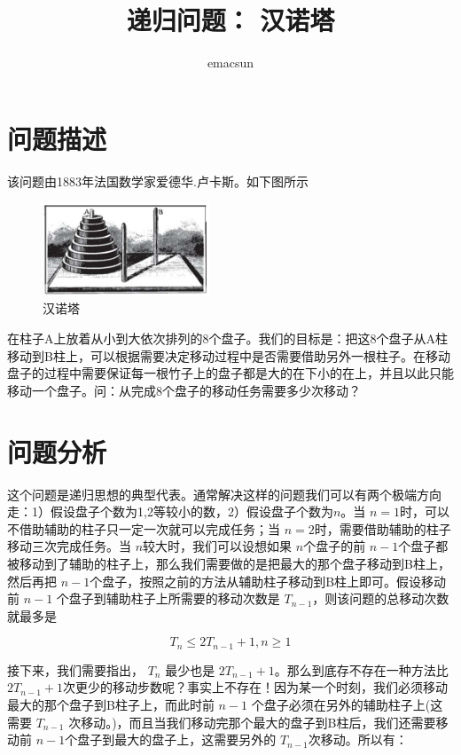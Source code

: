 \documentclass[10pt,a4paper,UTF8]{article}
\author{emacsun}
\date{}
\title{递归问题： 汉诺塔}
\begin{document}
\maketitle\xiaosihao
\tableofcontents\newpage\newpage


\section{问题描述}
\label{sec:orgheadline1}


该问题由1883年法国数学家爱德华.卢卡斯。如下图所示
\begin{figure}[htb]
\centering
\includegraphics[width=5cm]{../../img/hanoi.jpg}
\caption{汉诺塔}
\end{figure}

在柱子A上放着从小到大依次排列的8个盘子。我们的目标是：把这8个盘子从A柱移动到B柱上，可以根据需要决定移动过程中是否需要借助另外一根柱子。在移动盘子的过程中需要保证每一根竹子上的盘子都是大的在下小的在上，并且以此只能移动一个盘子。问：从完成8个盘子的移动任务需要多少次移动？

\section{问题分析}
\label{sec:orgheadline2}


这个问题是递归思想的典型代表。通常解决这样的问题我们可以有两个极端方向走：1）假设盘子个数为1,2等较小的数，2）假设盘子个数为\(n\)。当 \(n=1\)时，可以不借助辅助的柱子只一定一次就可以完成任务；当 \(n=2\)时，需要借助辅助的柱子移动三次完成任务。当 \(n\)较大时，我们可以设想如果 \(n\)个盘子的前 \(n-1\)个盘子都被移动到了辅助的柱子上，那么我们需要做的是把最大的那个盘子移动到B柱上，然后再把 \(n-1\)个盘子，按照之前的方法从辅助柱子移动到B柱上即可。假设移动前 \(n-1\) 个盘子到辅助柱子上所需要的移动次数是  \(T_{n-1}\)，则该问题的总移动次数就最多是

\[T_{n}\le 2T_{n-1} + 1, n\ge 1\]

接下来，我们需要指出，  \(T_{n}\) 最少也是 \(2T_{n-1} + 1\)。那么到底存不存在一种方法比 \(2T_{n-1} + 1\)次更少的移动步数呢？事实上不存在！因为某一个时刻，我们必须移动最大的那个盘子到B柱子上，而此时前 \(n-1\) 个盘子必须在另外的辅助柱子上(这需要 \(T_{n-1}\) 次移动。)，而且当我们移动完那个最大的盘子到B柱后，我们还需要移动前 \(n-1\)个盘子到最大的盘子上，这需要另外的 \(T_{n-1}\)次移动。所以有：
\end{document}
